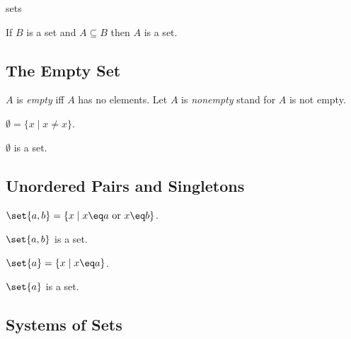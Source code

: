 \documentclass{article}
\begin{document}
\begin{smodule}{sets}
\begin{axiom*}[forthel,title=Separation Axiom,id=SeparationAx,printid]
  If $B$ is a set and $A\subseteq B$ then $A$ is a set.
\end{axiom*}


\subsection{The Empty Set}

\begin{definition*}[forthel,id=EmptyDef,printid]
  $A$ is \emph{empty} iff $A$ has no elements.
  Let $A$ is \emph{nonempty} stand for $A$ is not empty.
\end{definition*}

\begin{definition*}[forthel,id=EmptySetDef,printid]
  $\emptyset=\{x\mid x\neq x\}$.
\end{definition*}

\begin{axiom*}[forthel,title=Empty Set Axiom,id=EmptySetAx,printid]
  $\emptyset$ is a set.
\end{axiom*}


\subsection{Unordered Pairs and Singletons}

\begin{definition*}[forthel,id=UnorderedPairDef,printid]
  $\set{a,b}=\{x\mid x\eq a\text{ or }x\eq b\}$.
\end{definition*}

\begin{axiom*}[forthel,title=Pairing Axiom,id=UnorderedPairAx,printid]
  $\set{a,b}$ is a set.
\end{axiom*}

\begin{definition*}[forthel,id=SingletonDef,printid]
  $\set{a}=\{x\mid x\eq a\}$.
\end{definition*}

\begin{proposition*}[forthel,id=SingletonProp,printid]
  $\set{a}$ is a set.
\end{proposition*}


\subsection{Systems of Sets}


\end{smodule}
\end{document}
